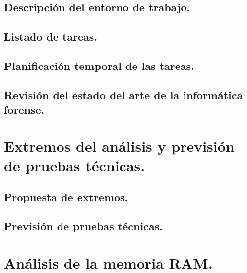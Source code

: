 \documentclass[12pt,a4paper]{report}
\begin{document}
\section{Descripción del entorno de trabajo.}
 

\section{Listado de tareas.}
 

\section{Planificación temporal de las tareas.}
 

\section{Revisión del estado del arte de la informática forense.}
 

\chapter{Extremos del análisis y previsión de pruebas técnicas.}


\section{Propuesta de extremos.}


\section{Previsión de pruebas técnicas.}
 

\chapter{Análisis de la memoria RAM.}

\end{document}
